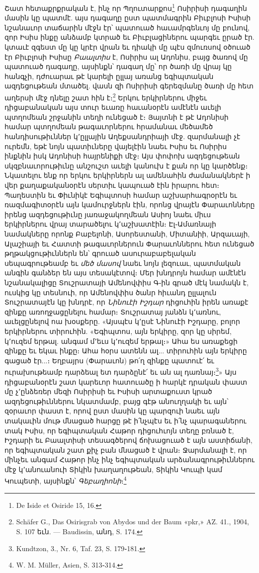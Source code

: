 \documentclass{article}
\begin{document}
{Շատ հետաքրքրական է, ինչ որ Պղուտարքոս\footnote{De Iside et Osiride 15, 16.} Ոսիրիսի դագաղին մասին կը պատմէ. այս դագաղը ըստ պատմագրին Բիւբլոսի Իսիսի նշանաւոր տաճարին մէջն էր՝ պատուած հաւամրգենւոյ մը բունով, զոր Իսիս ինքը անձամբ կտրած եւ Բիւբլացիներու պարգեւ ըրած էր. կտաւէ զգեստ մը կը կրէր վրան եւ դիակի մը պէս զմուռսով օծուած էր Բիւբլոսի Իսիսը \emph{Բաալտիս} է, Ոսիրիս ալ Ադոնիս, բայց ծառով մը պատուած դագաղը, այսինքն՝ դագաղ մը՝ որ ծառի մը վրայ կը հանգչի, դժուարաւ թէ կարելի ըլլայ առանց եգիպտական ազդեցութեան մտածել. վասն զի Ոսիրիսի գերեզմանը ծառի մը հետ աղերսի մէջ դնելը շատ հին է։\footnote{Schäfer G., Das Osirisgrab von Abydos und der Baum «pkr,» AZ. 41., 1904, S. 107 եւն. — Baudissin, անդ, S. 174.} Երկու երկիրներու միջեւ դիցաբանական այս տուր եւառը հաւանօրէն ամէնէն աւելի պտղոմեան շրջանին տեղի ունեցած է։ Յայտնի է թէ Ադոնիսի համար պտղոմեան թագաւորներու հրամանաւ մեծամեծ հանդիսութիւններ կ՚ըլլային Աղեքսանդրիայի մէջ. զարմանալի չէ ուրեմն, եթէ նոյն պատիւները վայելէին նաեւ Իսիս եւ Ոսիրիս ինքնին իսկ Ադոնիսի հայրենիքի մէջ։ Այս փոփոխ ազդեցութեան սկզբնաւորութիւնը անշուշտ աւելի կանուխ է քան որ կը կարծենք։ Նկատելու ենք որ երկու երկիրներն ալ ամենահին ժամանակներէ ի վեր քաղաքականօրէն սերտիւ կապուած էին իրարու հետ։ Պաղեստին եւ Փիւնիկէ Եգիպտոսի համար աշխարհագրօրէն եւ ռազմագիտօրէն այն կամուրջներն էին, որոնց վրայէն Փարաւոնները իրենց ազդեցութիւնը յառաջակողմեան Ասիոյ նաեւ միւս երկիրներու վրայ տարածելու կ՚աշխատէին։ Էլ֊Ամառնայի նամակները որոնք Բաբելոնի, Ասորեստանի, Միտանիի, Արզաւայի, Ալաշիայի եւ Հատտի թագաւորներուն Փարաւոններու հետ ունեցած թղթակցութիւններն են՝ գրուած ասուրաբաբելական սեպագրութեամբ եւ \emph{մեծ մասով} նաեւ նոյն լեզուաւ, պատմական անգին գանձեր են այս տեսակէտով։ Մեր խնդրոյն համար ամէնէն նշանակալիցը Տուշրատայի Ամենովփիս Գ֊ին գրած մէկ նամակն է, ուսկից կը տեսնուի, որ Ամենովփիս ծանր հիւանդ ըլլալուն Տուշրատայէն կը խնդրէ, որ \emph{Նինուէի Իշդար} դիցուհին իրեն առաքէ զինքը առողջացընելու համար։ Տուշրատայ յանձն կ՚առնու, աւելցընելով ոա խօսքերը. «Այսպէս կ՚ըսէ Նինուէի Իշդարը, բոլոր երկիրներու տիրուհին. «Եգիպտոս, այն երկիրը, զոր կը սիրեմ, կ՚ուզեմ երթալ. անգամ մ՚եւս կ՚ուզեմ երթալ։» Ահա ես առաքեցի զինքը եւ եկաւ ինքը։ Ահա հօրս ատենն ալ... տիրուհին այն երկիրը գացած էր...։ Եղբայրս (Փարաւոն) թո՛ղ զինքը պատուէ՛ եւ ուրախութեամբ դարձեալ ետ դարձընէ՛ եւ ան ալ դառնայ։\footnote{Kundtzon, 3., Nr. 6, Taf. 23, S. 179֊181.}» Այս դիցաբանօրէն շատ կարեւոր հատուածը ի հարկէ դրական փաստ մը չ՚ընձեռեր մեզի Ոսիրիսի եւ Իսիսի արտաքուստ կրած ազդեցութիւններու նկատմամբ, բայց գէթ անուղղակի եւ այն՝ զօրաւոր փաստ է, որով ըստ մասին կը պարզուի նաեւ այն տակաւին մութ մնացած հարցը թէ ի՛նչպէս եւ ի՛նչ պարագաներու տակ Իսիս, որ եգիպտական Հաթոր դիցուհւոյն տեղը բռնած է, Իշդարի եւ Բաալտիսի տեսագծերով ճոխացուած է այն աստիճանի, որ եգիպտական շատ քիչ բան մնացած է վրան։ Ջարմանալի է, որ մինչեւ անգամ Հաթոր ինչ ինչ եգիպտական արձանագրութիւններու մէջ կ՚անուանուի Տիկին խաղաղութեան, Տիկին Կուպի կամ Կուպետի, այսինքն՝ \emph{Գեբաղիոնի}։\footnote{W. M. Müller, Asien, S. 313֊314.}

}
\end{document}
